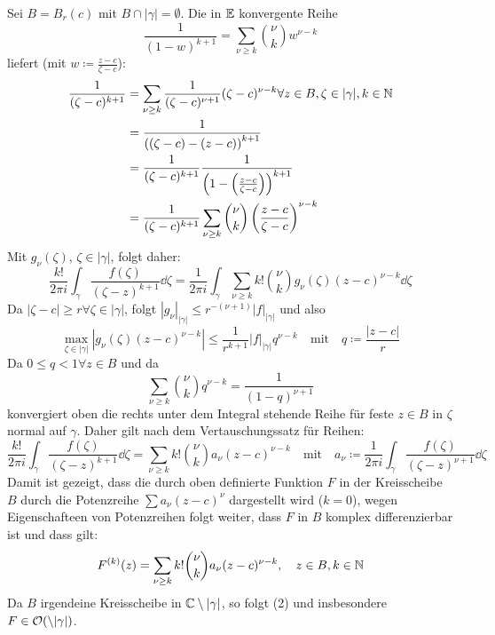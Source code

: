 \newpage
\begin{beweis}
	Sei $ B=B_r(c) $ mit $ B\cap|\gamma|=\emptyset $. Die in $ \mathbb{E} $ konvergente Reihe
	\[ \frac{1}{(1-w)^{k+1}}=\sum_{\nu\geq k}^{}\binom{\nu}{k}w^{\nu-k} \]
	liefert (mit $ w\coloneqq\frac{z-c}{\zeta-c} $):
	\begin{align*} \frac{1}{(\zeta-c)^{k+1}}&=\sum_{\nu\geq k}\frac{1}{(\zeta-c)^{\nu+1}}(\zeta-c)^{\nu-k}\forall z\in B,\zeta\in|\gamma|,k\in\mathbb{N}\\
	&=\frac{1}{\left((\zeta-c)-(z-c)\right)^{k+1}}\\
	&=\frac{1}{(\zeta-c)^{k+1}}\frac{1}{\left(1-\left(\frac{z-c}{\zeta-c}\right)\right)^{k+1}}\\
	&=\frac{1}{(\zeta-c)^{k+1}}\sum_{\nu\geq k}^{}\binom{\nu}{k}\left(\frac{z-c}{\zeta-c}\right)^{\nu-k} \end{align*}
	Mit $ g_\nu(\zeta) $, $ \zeta\in|\gamma| $, folgt daher:
	\[ \frac{k!}{2\pi i}\int_{\gamma}^{}\frac{f(\zeta)}{(\zeta-z)^{k+1}}\dd\zeta=\frac{1}{2\pi i}\int_{\gamma}^{}\sum_{\nu\geq k}^{}k!\binom{\nu}{k}g_\nu(\zeta)(z-c)^{\nu-k}\dd\zeta \]
	Da $ |\zeta-c|\geq r\forall\zeta\in|\gamma| $, folgt $ |g_\nu|_{|\gamma|}\leq r^{-(\nu+1)}|f|_{|\gamma|} $ und also
	\[ \max_{\zeta\in|\gamma|}|g_\nu(\zeta)(z-c)^{\nu-k}|\leq\frac{1}{r^{k+1}}|f|_{|\gamma|}q^{\nu-k}\quad\text{mit} \quad q\coloneqq\frac{|z-c|}{r}\]
	Da $ 0\leq q<1\forall z\in B $ und da
	\[ \sum_{\nu\geq k}^{}\binom{\nu}{k}q^{\nu-k}=\frac{1}{(1-q)^{\nu+1}} \]
	konvergiert oben die rechts unter dem Integral stehende Reihe f\"ur feste $ z\in B $ in $ \zeta $ normal auf $ \gamma $. Daher gilt nach dem Vertauschungssatz f\"ur Reihen:
	\[ \frac{k!}{2\pi i}\int_{\gamma}^{}\frac{f(\zeta)}{(\zeta-z)^{k+1}}\dd\zeta=\sum_{\nu\geq k}^{}k!\binom{\nu}{k}a_\nu(z-c)^{\nu-k}\quad\text{mit}\quad a_\nu\coloneqq\frac{1}{2\pi i}\int_{\gamma}^{}\frac{f(\zeta)}{(\zeta-z)^{\nu+1}}\dd\zeta \]
	Damit ist gezeigt, dass die durch oben definierte Funktion $ F $ in der Kreisscheibe $ B $ durch die Potenzreihe $ \sum a_\nu(z-c)^\nu $ dargestellt wird ($ k=0 $), wegen Eigenschafteen von Potenzreihen folgt weiter, dass $ F $ in $ B $ komplex differenzierbar ist und dass gilt:
	\[ F^{(k)}(z)=\sum_{\nu\geq k}^{}k!\binom{\nu}{k}a_\nu(z-c)^{\nu-k},\quad z\in B,k\in\mathbb{N} \]
	Da $ B $ irgendeine Kreisscheibe in $ \mathbb{C}\setminus|\gamma| $, so folgt (2)  und insbesondere $ F\in\mathcal O(\cal\setminus|\gamma|) $.
\end{beweis}